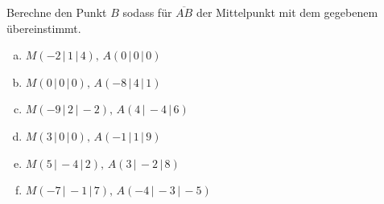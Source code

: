 \documentclass[a4paper,12pt]{article}
\newcommand{\Aufgabe}[2]{
	{
		\vspace*{0.3cm}
		\begin{tcolorbox}[breakable,colback=yellow!0,colframe=black!65!white,title=\textbf{Aufgabe #1:},width=\linewidth ]
			{#2}
		\end{tcolorbox}
		
		
	}
}
\begin{document}
	\Aufgabe{3.3.1.1 (Rückrechnung Mittelpunkt der Strecken)}{
		Berechne den Punkt $B$ sodass für $\overline{AB}$ der Mittelpunkt mit dem gegebenem übereinstimmt.
		\begin{multicols}{2}
			\begin{enumerate}[(a)]
				\item $M(-2\,|\,1 \,|\,4),\, A(0\,|\,0 \,|\,0)$
				\item $M(0\,|\,0 \,|\,0),\, A(-8\,|\,4 \,|\,1)$
				\item $M(-9\,|\,2 \,|\,-2),\, A(4\,|\,-4 \,|\,6)$
				\item $M(3\,|\,0 \,|\,0),\, A(-1\,|\,1 \,|\,9)$
				\item $M(5\,|\,-4 \,|\,2),\, A(3\,|\,-2 \,|\,8)$
				\item $M(-7\,|\,-1 \,|\,7),\, A(-4\,|\,-3 \,|\,-5)$
			\end{enumerate}
	\end{multicols}}
\end{document}
